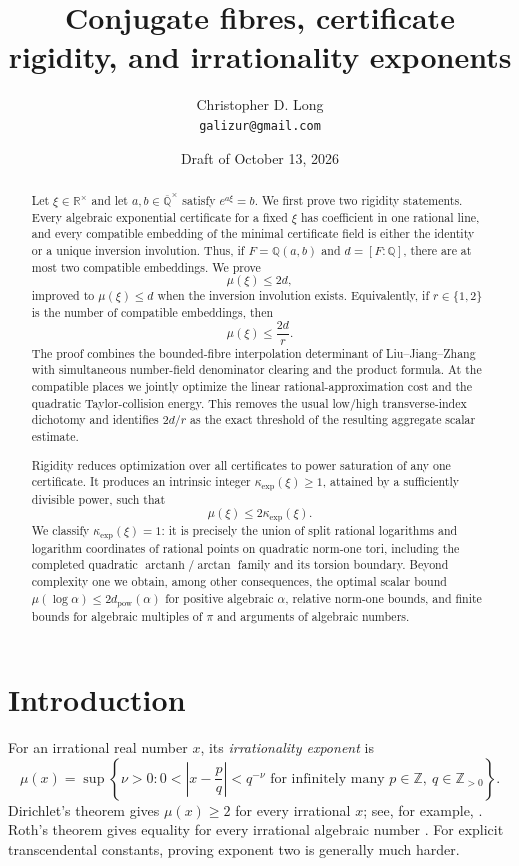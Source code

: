\documentclass[11pt]{article}
\title{Conjugate fibres, certificate rigidity, and irrationality exponents}
\author{Christopher D. Long\\[2pt]\small \texttt{galizur@gmail.com}}
\date{Draft of October 13, 2026}
\newcommand{\RR}{\mathbb R}
\newcommand{\QQ}{\mathbb Q}
\newcommand{\ZZ}{\mathbb Z}
\newcommand{\Qbar}{\overline{\mathbb Q}}
\DeclareMathOperator{\arctanh}{arctanh}
\theoremstyle{definition}
\theoremstyle{remark}
\numberwithin{equation}{section}
\begin{document}
\maketitle

\begin{abstract}
Let $\xi\in\RR^\times$ and let $a,b\in\Qbar^\times$ satisfy
$e^{a\xi}=b$.  We first prove two rigidity statements.  Every algebraic
exponential certificate for a fixed $\xi$ has coefficient in one
rational line, and every compatible embedding of the minimal
certificate field is either the identity or a unique inversion
involution.  Thus, if $F=\QQ(a,b)$ and $d=[F:\QQ]$, there are at most two
compatible embeddings.  We prove
\[
  \mu(\xi)\le 2d,
\]
improved to $\mu(\xi)\le d$ when the inversion involution exists.
Equivalently, if $r\in\{1,2\}$ is the number of compatible embeddings,
then
\[
  \mu(\xi)\le \frac{2d}{r}.
\]
The proof combines the bounded-fibre interpolation determinant of
Liu--Jiang--Zhang with simultaneous number-field denominator clearing
and the product formula.  At the compatible places we jointly optimize
the linear rational-approximation cost and the quadratic Taylor-collision
energy.  This removes the usual low/high transverse-index dichotomy and
identifies $2d/r$ as the exact threshold of the resulting aggregate scalar
estimate.

Rigidity reduces optimization over all certificates to power saturation
of any one certificate.  It produces an intrinsic integer
$\kappa_{\exp}(\xi)\ge1$, attained by a sufficiently divisible power,
such that
\[
  \mu(\xi)\le2\kappa_{\exp}(\xi).
\]
We classify $\kappa_{\exp}(\xi)=1$: it is precisely the union of split
rational logarithms and logarithm coordinates of rational points on
quadratic norm-one tori, including the completed quadratic
$\arctanh/\arctan$ family and its torsion boundary.  Beyond complexity
one we obtain, among other consequences, the optimal scalar bound
$\mu(\log\alpha)\le2d_{\mathrm{pow}}(\alpha)$ for positive algebraic
$\alpha$, relative norm-one bounds, and finite bounds for algebraic
multiples of $\pi$ and arguments of algebraic numbers.
\end{abstract}

\section{Introduction}\label{sec:introduction}

For an irrational real number $x$, its \emph{irrationality exponent} is
\[
 \mu(x)=\sup\left\{\nu>0:
  0<\left|x-\frac pq\right|<q^{-\nu}
  \text{ for infinitely many }p\in\ZZ,
  \ q\in\ZZ_{>0}\right\}.
\]
Dirichlet's theorem gives $\mu(x)\ge2$ for every irrational $x$; see,
for example, \cite[Chapter~I]{Cassels1957}.  Roth's theorem gives equality
for every irrational algebraic number \cite{Roth1955}.  For explicit
transcendental constants, proving exponent two is generally much harder.
\end{document}
